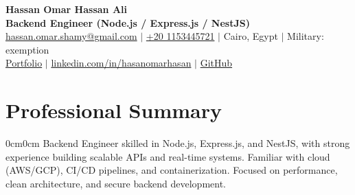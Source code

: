 \documentclass[10pt, letterpaper]{article}
\newenvironment{onecolentry}{\begin{adjustwidth}{0cm}{0cm}}{\end{adjustwidth}}
\begin{document}
\begin{center}
    {\fontsize{20pt}{20pt}\selectfont \textbf{Hassan Omar Hassan Ali}} \\[6pt]
    \textbf{Backend Engineer (Node.js / Express.js / NestJS)} \\[4pt]
    \href{mailto:hassan.omar.shamy@gmail.com}{hassan.omar.shamy@gmail.com} $|$ 
    \href{tel:+201153445721}{+20 1153445721} $|$ 
    Cairo, Egypt $|$ Military: exemption
  \\[4pt]
    \href{https://portfilo-orpin-phi.vercel.app}{Portfolio} $|$ 
    \href{https://linkedin.com/in/hasanomarhasan}{linkedin.com/in/hasanomarhasan} $|$ 
    \href{https://github.com/HasanOmarHasan}{GitHub}
\end{center}

\vspace{6pt}

\section{Professional Summary}
\begin{onecolentry}
Backend Engineer skilled in Node.js, Express.js, and NestJS, with strong experience building scalable APIs and real-time systems. Familiar with cloud (AWS/GCP), CI/CD pipelines, and containerization. Focused on performance, clean architecture, and secure backend development.
\end{onecolentry}

\end{document}
